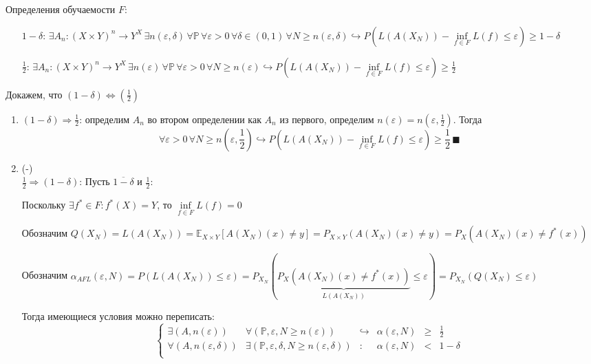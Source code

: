 \documentclass[a4paper]{article}
\def\eps{\varepsilon}
\begin{document}
Определения обучаемости $F$:
\begin{enumerate}
\item[$1-\delta$:] $\exists A_n\colon (X\times Y)^n\to Y^X\,\exists n(\eps,\delta)\,\forall\mathbb{P}\,\forall \eps >0\,\forall\delta\in (0,1) \,\forall N\geqslant n(\eps,\delta)\hookrightarrow P(L(A(X_N))-\inf\limits_{f\in F}L(f)\leqslant \eps)\geqslant 1-\delta$
\item[$\frac{1}{2}$:] $\exists A_n\colon (X\times Y)^n\to Y^X\,\exists n(\eps)\,\forall\mathbb{P}\,\forall \eps >0\,\forall N\geqslant n(\eps)\hookrightarrow P(L(A(X_N))-\inf\limits_{f\in F}L(f)\leqslant \eps)\geqslant \frac{1}{2}$
\end{enumerate}
Докажем, что $(1-\delta)\Leftrightarrow(\frac{1}{2})$
\begin{enumerate}
\item $(1-\delta)\Rightarrow \frac{1}{2}$: определим $A_n$ во втором определении как $A_n$ из первого, определим $n(\eps)=n(\eps,\frac{1}{2})$. Тогда $$\forall\eps>0\,\forall N\geqslant n(\eps,\frac{1}{2})\hookrightarrow P(L(A(X_N))-\inf\limits_{f\in F}L(f)\leqslant \eps)\geqslant \frac{1}{2}\,\blacksquare$$
\item (-)\\
$\frac{1}{2}\Rightarrow(1-\delta)$: Пусть $\overline{1-\delta}$ и $\frac{1}{2}$:

Поскольку $\exists f^*\in F\colon f^*(X)=Y$, то $\inf\limits_{f\in F}L(f)=0$

Обозначим $Q(X_N)=L(A(X_N))=\mathbb{E}_{X\times Y}[A(X_N)(x)\neq y]=P_{X\times Y}(A(X_N)(x)\neq y)=P_X(A(X_N)(x)\neq f^*(x))$

Обозначим $\alpha_{AFL}(\eps, N)=P\left(L(A(X_N))\leqslant\eps\right)=P_{X_N}(\underbrace{P_X(A(X_N)(x)\neq f^*(x))}_{L(A(X_N))}\leqslant\eps)=P_{X_N}(Q(X_N)\leqslant\eps)$

Тогда имеющиеся условия можно переписать:
$$\left\{\begin{array}{llllll}
\exists (A,n(\eps)) & \forall(\mathbb{P},\eps,N\geqslant n(\eps))        & \hookrightarrow & \alpha(\eps, N)  &\geqslant & \frac{1}{2}\\
\forall (A,n(\eps,\delta)) & \exists (\mathbb{P},\eps,\delta,N\geqslant n(\eps,\delta)) & \colon          & \alpha(\eps, N)  &<          & 1-\delta\\
\end{array}\right.$$


\end{enumerate}
\end{document}
